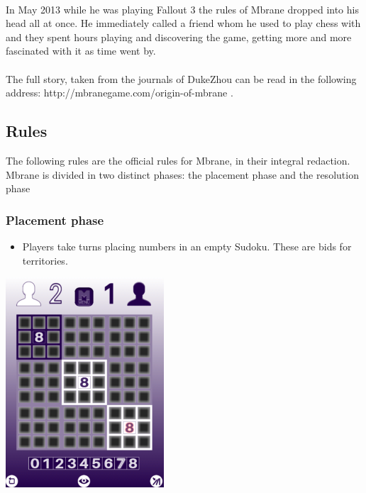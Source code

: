 \documentclass[a4paper]{article}
\begin{document}
\paragraph{}
In May 2013 while he was playing Fallout 3 the rules of Mbrane dropped into his head all at once. He immediately called a friend whom
he used to play chess with and they spent hours playing and discovering the game, getting more and more fascinated with it as time went by.

\paragraph{}
The full story, taken from the journals of DukeZhou can be read in the following address: 
http://mbranegame.com/origin-of-mbrane \cite{Origin}.

\subsection{Rules}
The following rules are the official rules for Mbrane, in their integral redaction.
Mbrane is divided in two distinct phases: the placement phase and the resolution phase

\subsubsection{Placement phase}
\begin{itemize}
    \item Players take turns placing numbers in an empty Sudoku. These are bids for territories. 
\end{itemize}
\begin{center}
    \includegraphics[scale=0.5]{img/tutorial_1.png}
\end{center}
\end{document}
